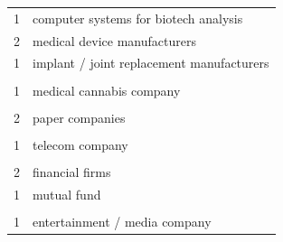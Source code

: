 \documentclass[final]{article}
\begin{document}
\begin{table}[H]
\begin{tabular}{@{}cl@{}}
  1 & computer systems for biotech analysis \\
  2 & medical device manufacturers \\
  1 & implant / joint replacement manufacturers \\
  & \\
  1 & medical cannabis company \\
  & \\
  2 & paper companies \\
  & \\
  1 & telecom company \\
  & \\
  2 & financial firms \\
  1 & mutual fund \\
    & \\
  1 & entertainment / media company \\
  \bottomrule
\end{tabular}
\end{table}












\end{document}
